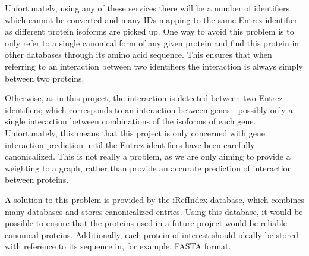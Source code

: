 Unfortunately, using any of these services there will be a number of identifiers which cannot be converted and many IDs mapping to the same Entrez identifier as different protein isoforms are picked up.
One way to avoid this problem is to only refer to a single canonical form of any given protein and find this protein in other databases through its amino acid sequence.
This ensures that when referring to an interaction between two identifiers the interaction is always simply between two proteins.

Otherwise, as in this project, the interaction is detected between two Entrez identifiers; which corresponds to an interaction between genes - possibly only a single interaction between combinations of the isoforms of each gene.
Unfortunately, this means that this project is only concerned with gene interaction prediction until the Entrez identifiers have been carefully canonicalized.
This is not really a problem, as we are only aiming to provide a weighting to a graph, rather than provide an accurate prediction of interaction between proteins.

A solution to this problem is provided by the iRefIndex\autocite{razick_irefindex:_2008} database, which combines many databases and stores canonicalized entries.
Using this database, it would be possible to ensure that the proteins used in a future project would be reliable canonical proteins.
Additionally, each protein of interest should ideally be stored with reference to its sequence in, for example, FASTA format.

